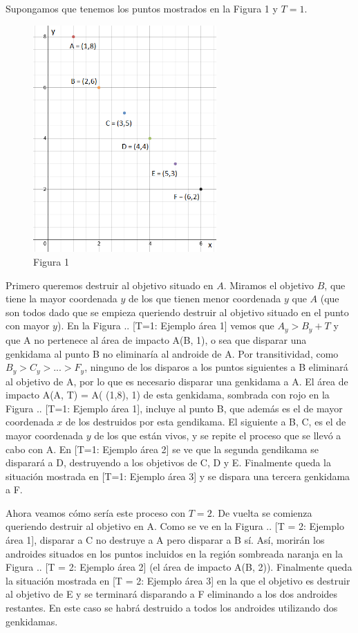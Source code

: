 \documentclass[10pt,a4paper]{article}
\begin{document}
Supongamos que tenemos los puntos mostrados en la Figura 1 y $T = 1$.
\begin{figure}
  \centering
  \includegraphics[width=7cm]{EjemploInicialUtil}
  \caption{Figura 1}
\end{figure}
Primero queremos destruir al objetivo situado en $A$. Miramos el objetivo $B$, que tiene la mayor coordenada $y$ de los que tienen menor coordenada $y$ que $A$ (que son todos dado que se empieza queriendo destruir al objetivo situado en el punto con mayor $y$). En la Figura .. [T=1: Ejemplo área 1] vemos que $A_{y} > B_{y} + T$ y que A no pertenece al área de impacto A(B, 1), o sea que disparar una genkidama al punto B no eliminaría al androide de A. Por transitividad, como $B_{y} > C_{y} > ... > F_{y}$, ninguno de los disparos a los puntos siguientes a B eliminará al objetivo de A, por lo que es necesario disparar una genkidama a A. El área de impacto A(A, T) = A( (1,8), 1) de esta genkidama, sombrada con rojo en la Figura .. [T=1: Ejemplo área 1], incluye al punto B, que además es el de mayor coordenada $x$ de los destruidos por esta gendikama. 
El siguiente a B, C, es el de mayor coordenada $y$ de los que están vivos, y se repite el proceso que se llevó a cabo con A. En [T=1: Ejemplo área 2] se ve que la segunda gendikama se disparará a D, destruyendo a los objetivos de C, D y E.
Finalmente queda la situación mostrada en [T=1: Ejemplo área 3] y se dispara una tercera genkidama a F.

Ahora veamos cómo sería este proceso con $T = 2$.
De vuelta se comienza queriendo destruir al objetivo en A. Como se ve en la Figura .. [T = 2: Ejemplo área 1], disparar a C no destruye a A pero disparar a B sí. Así, morirán los androides situados en los puntos incluidos en la región sombreada naranja en la Figura .. [T = 2: Ejemplo área 2] (el área de impacto A(B, 2)).
Finalmente queda la situación mostrada en [T = 2: Ejemplo área 3] en la que el objetivo es destruir al objetivo de E y se terminará disparando a F eliminando a los dos androides restantes.
En este caso se habrá destruido a todos los androides utilizando dos genkidamas.
\end{document}
